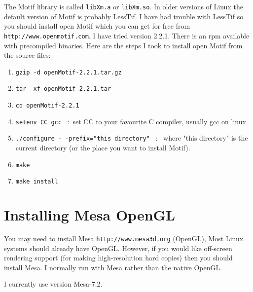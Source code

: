 \documentclass{article}
\begin{document}
The Motif library
is called {\tt libXm.a} or {\tt libXm.so}. In older versions of Linux the default version of
Motif is probably LessTif. I have had trouble with LessTif 
so you should install open Motif which you can get for free from \texttt{http://www.openmotif.com}. 
I have tried version 2.2.1.
There is an rpm available with precompiled binaries.
Here are the steps I took to install open Motif from the source files:
\begin{enumerate}
    \item {\tt gzip -d openMotif-2.2.1.tar.gz}
    \item {\tt tar -xf openMotif-2.2.1.tar}
    \item {\tt cd openMotif-2.2.1}
    \item {\tt setenv CC gcc} ~:~set CC to your favourite C compiler, usually gcc on linux
    \item {\tt ./configure -\,-prefix="this directory"} ~:~ where "this directory" is the current directory
       (or the place you want to install Motif).
    \item {\tt make}
    \item {\tt make install}
\end{enumerate}   


\clearpage
\section{Installing Mesa OpenGL}

You may need to install Mesa \texttt{http://www.mesa3d.org} (OpenGL),
Most Linux systems should already have OpenGL. However, if you would like off-screen rendering
support (for making high-resolution hard copies) then you should install Mesa. I normally run with
Mesa rather than the native OpenGL.

I currently use version Mesa-7.2.
\end{document}
